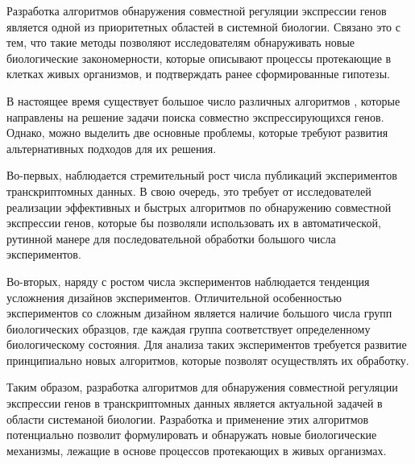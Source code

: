 
{\actuality} Разработка алгоритмов обнаружения совместной регуляции экспрессии генов является одной из приоритетных областей в системной биологии.
Связано это с тем, что такие методы позволяют исследователям обнаруживать новые биологические закономерности, которые описывают процессы протекающие в клетках живых организмов, и подтверждать ранее сформированные гипотезы.


В настоящее время существует большое число различных алгоритмов \todo{\autocite{}}, которые направлены на решение задачи поиска совместно экспрессирующихся генов. 
Однако, можно выделить две основные проблемы, которые требуют развития альтернативных подходов для их решения.

Во-первых, наблюдается стремительный рост числа публикаций экспериментов транскриптомных данных.
В свою очередь, это требует от исследователей реализации эффективных и быстрых алгоритмов по обнаружению совместной экспрессии генов, которые бы позволяли использовать их в автоматической, рутинной манере для последовательной обработки большого числа экспериментов.

Во-вторых, наряду с ростом числа экспериментов наблюдается тенденция усложнения дизайнов экспериментов.
Отличительной особенностью экспериментов со сложным дизайном является наличие большого числа групп биологических образцов, где каждая группа соответствует определенному биологическому состояния.
Для анализа таких экспериментов требуется развитие принципиально новых алгоритмов, которые позволят осуществлять их обработку. 

Таким образом, разработка алгоритмов для обнаружения совместной регуляции экспрессии генов в транскриптомных данных является актуальной задачей в области системаной биологии. 
Разработка и применение этих алгоритмов потенциально позволит формулировать и обнаружать новые биологические механизмы, лежащие в основе процессов протекающих в живых организмах. 


